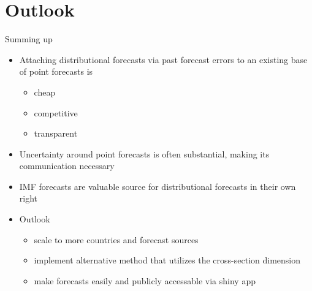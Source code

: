 \documentclass[en]{sdqbeamer}
\begin{document}
\section{Outlook}

\begin{frame}{Summing up}
\begin{itemize}
\item Attaching distributional forecasts via past forecast errors to an existing base of point forecasts is
    \begin{itemize}
        \item cheap
        \item competitive
        \item transparent
    \end{itemize}
\item Uncertainty around point forecasts is often substantial, making its communication necessary
\item IMF forecasts are valuable source for distributional forecasts in their own right \bigskip \\
\item     Outlook
    \begin{itemize}
        \item scale to more countries and forecast sources
        \item implement alternative method that  utilizes the cross-section dimension%
        \item make forecasts easily and publicly accessable via shiny app
    \end{itemize}

\end{itemize}
\end{frame}
\end{document}
